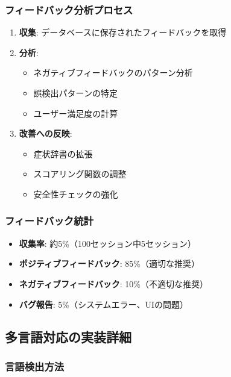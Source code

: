 \documentclass[a4paper,11pt,ja=standard,xelatex]{bxjsarticle}
\theoremstyle{definition}
\begin{document}
\subsubsection{フィードバック分析プロセス}

\begin{enumerate}
\item \textbf{収集}: データベースに保存されたフィードバックを取得
\item \textbf{分析}: 
  \begin{itemize}
  \item ネガティブフィードバックのパターン分析
  \item 誤検出パターンの特定
  \item ユーザー満足度の計算
  \end{itemize}
\item \textbf{改善への反映}: 
  \begin{itemize}
  \item 症状辞書の拡張
  \item スコアリング関数の調整
  \item 安全性チェックの強化
  \end{itemize}
\end{enumerate}

\subsubsection{フィードバック統計}

\begin{itemize}
\item \textbf{収集率}: 約5\%（100セッション中5セッション）
\item \textbf{ポジティブフィードバック}: 85\%（適切な推奨）
\item \textbf{ネガティブフィードバック}: 10\%（不適切な推奨）
\item \textbf{バグ報告}: 5\%（システムエラー、UIの問題）
\end{itemize}

\subsection{多言語対応の実装詳細}

\subsubsection{言語検出方法}
\end{document}
